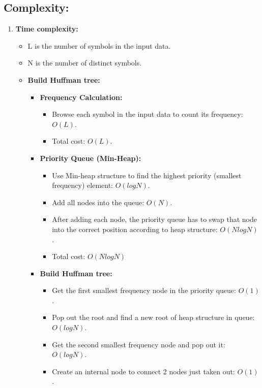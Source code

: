     \subsection{Complexity:}
    \begin{enumerate}[label=\textbf{\Alph*.}]
        \item \textbf{Time complexity:}
        \begin{itemize}
            \item L is the number of symbols in the input data.
            \item N is the number of distinct symbols.
            \item \textbf{Build Huffman tree:}
            \begin{itemize}
                \item \textbf{Frequency Calculation:}
                \begin{itemize}
                    \item Browse each symbol in the input data to count its frequency: $O(L)$.
                    \item Total cost: $O(L)$.
                \end{itemize}
                \item \textbf{Priority Queue (Min-Heap):}
                \begin{itemize}
                    \item Use Min-heap structure to find the highest priority (smallest frequency) element: $O(logN)$.
                    \item Add all nodes into the queue: $O(N)$.
                    \item After adding each node, the priority queue has to swap that node into the correct position according to heap structure: $O(NlogN)$.
                    \item Total cost: $O(NlogN)$
                \end{itemize}
                \item \textbf{Build Huffman tree:}
                \begin{itemize}
                    \item Get the first smallest frequency node in the priority queue: $O(1)$.
                    \item Pop out the root and find a new root of heap structure in queue: $O(logN)$.
                    \item Get the second smallest frequency node and pop out it: $O(logN)$.
                    \item Create an internal node to connect 2 nodes just taken out: $O(1)$.

\end{itemize}
\end{itemize}
\end{itemize}
\end{enumerate}
